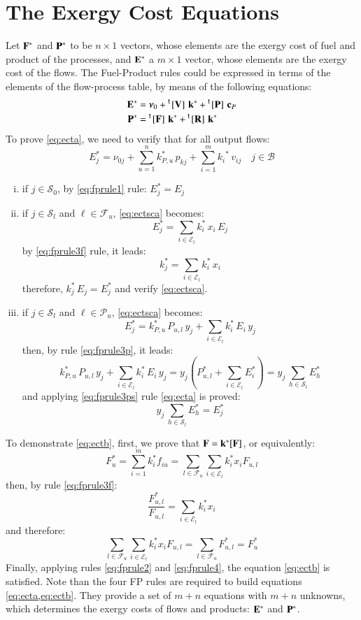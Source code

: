 \documentclass{ecos2018}
\begin{document}
\section{The Exergy Cost Equations}
Let $\mathbf{F}^*$ and $\mathbf{P}^*$ to be $n\times1$ vectors, whose elements are the exergy cost of fuel and product of the processes, and $\mathbf{E}^*$ a $m\times1$ vector, whose elements are the exergy cost of the flows.
The Fuel-Product rules could be expressed in terms of the elements of the flow-process table, by means of the following equations:
\begin{align}
\mathbf{E}^{*}&=\bm{\nu}_0+\prescript{\smash{\mathsf{t}}}{}{\mskip-1mu}\left[ \textbf{V} \right]\,\mathbf{k}^{*}+\prescript{\smash{\mathsf{t}}}{}{\mskip-1mu}\left[ \textbf{P} \right]\,\mathbf{c}_P \label{eq:ecta}\\
\mathbf{P}^{*}&= \prescript{\smash{\mathsf{t}}}{}{\mskip-1mu}\left[ \textbf{F} \right]\,\mathbf{k}^{*}+ \prescript{\smash{\mathsf{t}}}{}{\mskip-1mu}\left[ \textbf{R} \right]\,\mathbf{k}^{*} \label{eq:ectb}
\end{align}
To prove \cref{eq:ecta}, we need to verify that for all output flows:
\begin{equation}
\label{eq:ectsca}
E_{j}^{*}=\nu_{0j}+\sum_{u=1}^{n}{k_{P,u}^{*}\,p_{kj}+\sum_{i=1}^{m}{k_{i}}^{*}\,v_{ij}} \quad j\in\mathcal{B}
\end{equation}
\begin{enumerate}[i)]
	\item if $j\in\mathcal{S}_0$, by \ref{eq:fprule1} rule: $E_j^*=E_j$
	\item if $j\in\mathcal{S}_l$ and $\ell\in\mathcal{F}_u$, \cref{eq:ectsca} becomes:
	\[
	E_j^*=\sum_{i\in\mathcal{E}_l}{k_i^*\,x_i\,E_j}
	\]
	by \ref{eq:fprule3f} rule, it leads:
	\[
	k_j^*=\sum_{i\in\mathcal{E}_l}{k_i^*\,x_i}
	\]
	therefore, $k_j^*\,E_j=E_j^*$ and verify \cref{eq:ectsca}.
	\item if $j\in\mathcal{S}_l$ and $\ell\in\mathcal{P}_u$, \cref{eq:ectsca} becomes:
	\[
	E_j^*=k_{P,u}^*\,P_{u,l}\,y_j+\sum_{i\in\mathcal{E}_l}{k_i^*\,E_i\,y_j}
	\]
	then, by rule \ref{eq:fprule3p}, it leads:
	\[
	k_{P,u}^*\,P_{u,l}\,y_j+\sum_{i\in\mathcal{E}_l}{k_i^*\,E_i\,y_j}=
	y_j\left(P_{u,l}^{*}+\sum_{i\in\mathcal{E}_l}{E_i^*}\right)=y_j\,\sum_{h\in\mathcal{S}_l}{E_h^*}
	\]
	and applying \ref{eq:fprule3ps} rule \cref{eq:ecta} is proved:
	\[
	y_j\,\sum_{h\in\mathcal{S}_l}{E_h^*}=E_j^*
	\]
\end{enumerate}
To demonstrate \cref{eq:ectb}, first, we prove that $\mathbf{F}=\mathbf{k}^*[\mathbf{F}]$, or equivalently:
\begin{equation}
F_u^*=\sum_{i=1}^{m}{k_i^* f_{iu}}=\sum_{l\in\mathcal{F}_u}{\sum_{i\in\mathcal{E}_l}{k_i^* x_i F_{u,l}}}
\end{equation}
then, by rule \ref{eq:fprule3f}:
\[
\frac{F_{u,l}^*}{F_{u,l}}=\sum_{i\in\mathcal{E}_l}{k_i^*x_i}
\]
and therefore:
\[
\sum_{l\in\mathcal{F}_u}{\sum_{i\in\mathcal{E}_l}{k_i^* x_i F_{u,l}}=\sum_{l\in\mathcal{F}_u}{F_{u,l}^*}}=F_u^*
\]
Finally, applying rules \ref{eq:fprule2} and \ref{eq:fprule4}, the equation \eqref{eq:ectb} is satisfied.
Note than the four FP rules are required to build equations \cref{eq:ecta,eq:ectb}. They provide a set of $m+n$ equations with $m+n$ unknowns, which determines the exergy costs of flows and products: $\mathbf{E}^*$ and $\mathbf{P}^*$.
\end{document}
